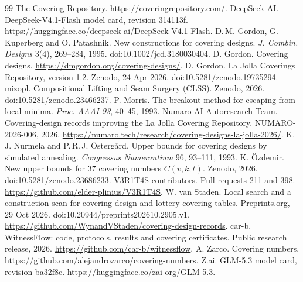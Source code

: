 \documentclass[11pt,letterpaper]{article}
\begin{document}
\par\ifdim\dimexpr\pagegoal-\pagetotal\relax<8\baselineskip\clearpage\fi
\begingroup
\footnotesize
\raggedright
\renewcommand{\refname}{References{\normalfont\small\enspace web sources read on 3 November 2026}}
\begin{thebibliography}{99}
\setlength{\itemsep}{0pt}\setlength{\parsep}{0pt}
 The Covering Repository. \url{https://coveringrepository.com/}.
 DeepSeek-AI. DeepSeek-V4.1-Flash model card, revision 314113f. \url{https://huggingface.co/deepseek-ai/DeepSeek-V4.1-Flash}.
 D.\,M. Gordon, G. Kuperberg and O. Patashnik. New constructions for covering designs. \emph{J. Combin. Designs} 3(4), 269--284, 1995. doi:10.1002/jcd.3180030404.
 D. Gordon. Covering designs. \url{https://dmgordon.org/covering-designs/}.
 D. Gordon. La Jolla Coverings Repository, version 1.2. Zenodo, 24 Apr 2026. doi:10.5281/zenodo.19735294.
 mizopl. Compositional Lifting and Seam Surgery (CLSS). Zenodo, 2026. doi:10.5281/zenodo.23466237.
 P. Morris. The breakout method for escaping from local minima. \emph{Proc. AAAI-93}, 40--45, 1993.
 Numaro AI Autoresearch Team. Covering-design records improving the La Jolla Covering Repository. NUMARO-2026-006, 2026. \url{https://numaro.tech/research/covering-designs-la-jolla-2026/}.
 K.\,J. Nurmela and P.\,R.\,J. \"Osterg\aa rd. Upper bounds for covering designs by simulated annealing. \emph{Congressus Numerantium} 96, 93--111, 1993.
 K. \"Ozdemir. New upper bounds for 37 covering numbers $C(v,k,t)$. Zenodo, 2026. doi:10.5281/zenodo.23686233.
 V3R1T4S contributors. Pull requests 211 and 398. \url{https://github.com/elder-plinius/V3R1T4S}.
 W. van Staden. Local search and a construction scan for covering-design and lottery-covering tables. Preprints.org, 29 Oct 2026. doi:10.20944/preprints202610.2905.v1. \url{https://github.com/WynandVStaden/covering-design-records}.
 car-b. WitnessFlow: code, protocols, results and covering certificates. Public research release, 2026. \url{https://github.com/car-b/witnessflow}.
 A. Zarco. Covering numbers. \url{https://github.com/alejandrozarco/covering-numbers}.
 Z.ai. GLM-5.3 model card, revision ba32f8c. \url{https://huggingface.co/zai-org/GLM-5.3}.
\end{thebibliography}
\endgroup
\end{document}
